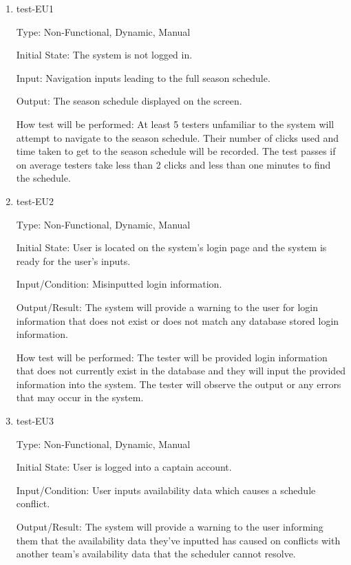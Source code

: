 \documentclass[12pt, titlepage]{article}
\begin{document}
\begin{enumerate}

  \item{test-EU1\\}

  Type: Non-Functional, Dynamic, Manual

  Initial State: The system is not logged in.

  Input: Navigation inputs leading to the full season schedule.

  Output: The season schedule displayed on the screen.

  How test will be performed: At least 5 testers unfamiliar to the system will
  attempt to navigate to the season schedule. Their number of clicks used and
  time taken to get to the season schedule will be recorded. The test passes
  if on average testers take less than 2 clicks and less than one minutes to
  find the schedule.

  \item{test-EU2\\}

  Type: Non-Functional, Dynamic, Manual

  Initial State: User is located on the system's login page and the system is ready
  for the user's inputs.

  Input/Condition: Misinputted login information.

  Output/Result: The system will provide a warning to the user for login information that
  does not exist or does not match any database stored login information.

  How test will be performed: The tester will be provided login information that does not
  currently exist in the database and they will input the provided information into the
  system. The tester will observe the output or any errors that may occur in the system.

  \item{test-EU3\\}
  
  Type: Non-Functional, Dynamic, Manual
            
  Initial State: User is logged into a captain account.
            
  Input/Condition: User inputs availability data which causes a schedule conflict.
            
  Output/Result: The system will provide a warning to the user informing them that
  the availability data they've inputted has caused on conflicts with another team's
  availability data that the scheduler cannot resolve.
            

\end{enumerate}
\end{document}
